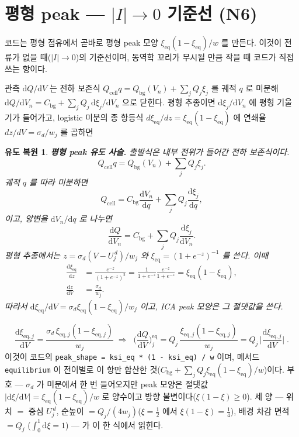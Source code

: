 \documentclass[11pt,a4paper]{article}
\newtheorem*{derivebox}{유도 복원}
\newcommand{\dd}{\mathrm{d}}
\newcommand{\eq}{\mathrm{eq}}
\newcommand{\cell}{\mathrm{cell}}
\newcommand{\bg}{\mathrm{bg}}
\newcommand{\code}[1]{\texttt{#1}}
\begin{document}
\section{평형 peak — $|I|\to0$ 기준선 (N6)}\label{sec:eqpeak}
코드는 평형 점유에서 곧바로 평형 peak 모양 $\xi_\eq(1-\xi_\eq)/w$ 를 만든다. 이것이 전류가 없을 때($|I|\to0$)의
기준선이며, 동역학 꼬리가 무시될 만큼 작을 때 코드가 직접 쓰는 항이다.

관측 $\dd Q/\dd V$ 는 전하 보존식 $Q_\cell q=Q_\bg(V_n)+\sum_jQ_j\xi_j$ 를 궤적 $q$ 로 미분해
$\dd Q/\dd V_n=C_\bg+\sum_jQ_j\,\dd\xi_j/\dd V_n$ 으로 닫힌다. 평형 추종이면 $\dd\xi_j/\dd V_n$ 에 평형 기울기가 들어가고,
logistic 미분의 종 항등식 $d\xi_\eq/dz=\xi_\eq(1-\xi_\eq)$ 에 연쇄율 $dz/dV=\sigma_d/w_j$ 를 곱하면
\begin{derivebox}
\textbf{평형 peak 유도 사슬.} 출발식은 내부 전위가 들어간 전하 보존식이다.
\begin{equation*}
Q_\cell q=Q_\bg(V_n)+\sum_jQ_j\xi_j .
\end{equation*}
궤적 $q$ 를 따라 미분하면
\begin{equation*}
Q_\cell=C_\bg\frac{\dd V_n}{\dd q}+\sum_jQ_j\frac{\dd\xi_j}{\dd q},
\end{equation*}
이고, 양변을 $\dd V_n/\dd q$ 로 나누면
\begin{equation*}
\frac{\dd Q}{\dd V_n}=C_\bg+\sum_jQ_j\frac{\dd\xi_j}{\dd V_n}.
\end{equation*}
평형 추종에서는 $z=\sigma_d(V-U_j^{\,d})/w_j$ 와
$\xi_\eq=(1+e^{-z})^{-1}$ 를 쓴다. 이때
\begin{align*}
\frac{\dd\xi_\eq}{\dd z}
&=\frac{e^{-z}}{(1+e^{-z})^2}
=\frac{1}{1+e^{-z}}\frac{e^{-z}}{1+e^{-z}}
=\xi_\eq(1-\xi_\eq),\\
\frac{\dd z}{\dd V}&=\frac{\sigma_d}{w_j}.
\end{align*}
따라서 $\dd\xi_\eq/\dd V=\sigma_d\xi_\eq(1-\xi_\eq)/w_j$ 이고, ICA peak 모양은 그 절댓값을 쓴다.
\end{derivebox}
\begin{equation}
\frac{\dd\xi_{\eq,j}}{\dd V}=\frac{\sigma_d\,\xi_{\eq,j}(1-\xi_{\eq,j})}{w_j}
\;\Longrightarrow\;
\boxed{\;\Big(\frac{\dd Q}{\dd V}\Big)^\eq_j
=Q_j\,\frac{\xi_{\eq,j}(1-\xi_{\eq,j})}{w_j}
=Q_j\,\Big|\frac{\dd\xi_{\eq,j}}{\dd V}\Big|\;.}
\label{eq:eqpeak}
\end{equation}
이것이 코드의 \code{peak\_shape = ksi\_eq * (1 - ksi\_eq) / w} 이며, 메서드 \code{equilibrium} 이 전이별로 이 항만
합산한 것($C_\bg+\sum_jQ_j\xi_\eq(1-\xi_\eq)/w$)이다. 부호 — $\sigma_d$ 가 미분에서 한 번 들어오지만 peak 모양은
절댓값 $|\dd\xi/\dd V|=\xi_\eq(1-\xi_\eq)/w$ 로 양수이고 방향 불변이다($\xi(1-\xi)\ge0$). 세 양 — 위치 $=$ 중심
$U_j^{\,d}$, 순높이 $=Q_j/(4w_j)$($\xi=\tfrac12$ 에서 $\xi(1-\xi)=\tfrac14$), 배경 차감 면적 $=Q_j$
($\int_0^1\dd\xi=1$) — 가 이 한 식에서 읽힌다.
\end{document}
